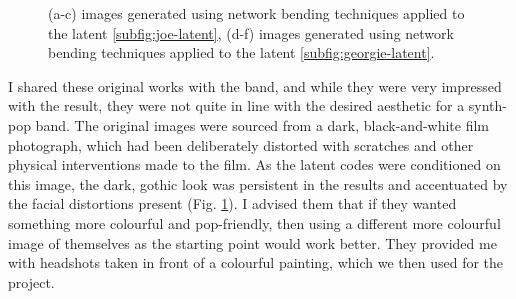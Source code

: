 \begin{figure}[!htbp]
    \hfill
    \hfill
    \hfill
    \caption[Network bending applied to 0171 headshots]{(a-c) images generated using network bending techniques applied to the latent \ref{subfig:joe-latent}, (d-f) images generated using network bending techniques applied to the latent \ref{subfig:georgie-latent}.}
    \label{fig:c7:0171-haunted}
 \end{figure}

I shared these original works with the band, and while they were very impressed with the result, they were not quite in line with the desired aesthetic for a synth-pop band. 
The original images were sourced from a dark, black-and-white film photograph, which had been deliberately distorted with scratches and other physical interventions made to the film. 
As the latent codes were conditioned on this image, the dark, gothic look was persistent in the results and accentuated by the facial distortions present  (Fig. \ref{fig:c7:0171-haunted}). 
I advised them that if they wanted something more colourful and pop-friendly, then using a different more colourful image of themselves as the starting point would work better.
They provided me with headshots taken in front of a colourful painting, which we then used for the project. 

